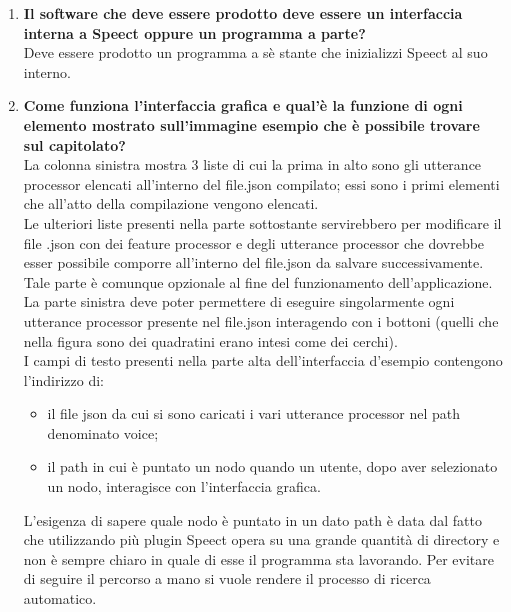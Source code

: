 \documentclass[openany,12pt,a4paper]{article}
\begin{document}
\begin{enumerate}
	\item \textbf{ Il software che deve essere prodotto deve essere un interfaccia interna a Speect oppure un programma a parte?}\\
	Deve essere prodotto un programma a sè stante che inizializzi Speect al suo interno.

	\item \textbf{Come funziona l'interfaccia grafica e qual'è la funzione di ogni elemento mostrato sull'immagine esempio che è possibile trovare sul capitolato?}\\
	La colonna sinistra mostra 3 liste di cui la prima in alto sono gli utterance processor elencati all'interno del file.json compilato; essi sono i primi elementi che all'atto della compilazione vengono elencati.
    \\ Le ulteriori liste presenti nella parte sottostante servirebbero per modificare il file .json con dei feature processor e degli utterance processor che dovrebbe esser possibile comporre all'interno del file.json da salvare successivamente.
    \\ Tale parte è comunque opzionale al fine del funzionamento dell'applicazione.
    \\ La parte sinistra deve poter permettere di eseguire singolarmente ogni utterance processor presente nel file.json interagendo con i bottoni (quelli che nella figura sono dei quadratini erano intesi come dei cerchi).
    \\I campi di testo presenti nella parte alta dell'interfaccia d'esempio contengono l'indirizzo di:
    \begin{itemize}
    \item il file json da cui si sono caricati i vari utterance processor nel path denominato voice;
    \item il path in cui è puntato un nodo quando un utente, dopo aver selezionato un nodo, interagisce con l'interfaccia grafica.
    \end{itemize}
     L'esigenza di sapere quale nodo è puntato in un dato path è data dal fatto che utilizzando più plugin Speect opera su una grande quantità di directory e non è sempre chiaro in quale di esse il programma sta lavorando. Per evitare di seguire il percorso a mano si vuole rendere il processo di ricerca automatico.


\end{enumerate}
\end{document}
